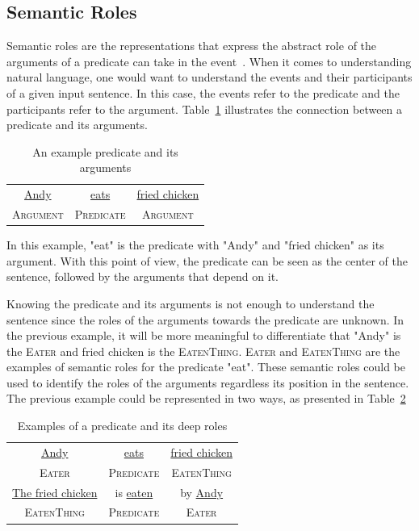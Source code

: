 \subsection{Semantic Roles}
Semantic roles are the representations that express the abstract role of the arguments of a predicate can take in the event~\citep{jurafsky2016speech}. When it comes to understanding natural language, one would want to understand the events and their participants of a given input sentence. In this case, the events refer to the predicate and the participants refer to the argument. Table~\ref{tab:examplesrl1} illustrates the connection between a predicate and its arguments.

\begin{table}
	\centering
	\caption{An example predicate and its arguments}
	\label{tab:examplesrl1}
	\begin{tabular}{|ccc|}
		\hline
		\underline{Andy} & \underline{eats} & \underline{fried chicken} \\
		\textsc{Argument} & \textsc{Predicate} & \textsc{Argument} \\
		\hline
	\end{tabular}
\end{table}

In this example, "eat" is the predicate with "Andy" and "fried chicken" as its argument. With this point of view, the predicate can be seen as the center of the sentence, followed by the arguments that depend on it.

Knowing the predicate and its arguments is not enough to understand the sentence since the roles of the arguments towards the predicate are unknown. In the previous example, it will be more meaningful to differentiate that "Andy" is the \textsc{Eater} and fried chicken is the \textsc{EatenThing}. \textsc{Eater} and \textsc{EatenThing} are the examples of semantic roles for the predicate "eat". These semantic roles could be used to identify the roles of the arguments regardless its position in the sentence. The previous example could be represented in two ways, as presented in Table~\ref{tab:examplesrl2}

\begin{table}
	\centering
	\caption{Examples of a predicate and its deep roles}
	\label{tab:examplesrl2}
	\begin{tabular}{|ccc|}
		\hline
		\underline{Andy} & \underline{eats} & \underline{fried chicken} \\
		\textsc{Eater} & \textsc{Predicate} & \textsc{EatenThing} \\
		\hline
		\underline{The fried chicken} & is \underline{eaten} & by \underline{Andy} \\
		\textsc{EatenThing} & \textsc{Predicate} & \textsc{Eater} \\
		\hline
	\end{tabular}
\end{table}

